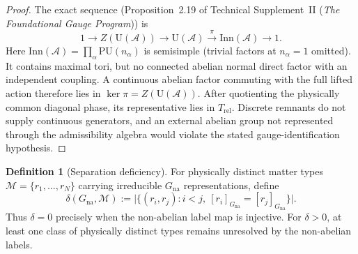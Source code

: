 \documentclass[11pt]{article}
\theoremstyle{definition}
\newtheorem{definition}[theorem]{Definition}
\newcommand{\TSII}{Technical Supplement~II (\emph{The Foundational Gauge Program})}
\begin{document}
\begin{proof}
The exact sequence (Proposition~2.19 of \TSII{}) is
\[
  1\longrightarrow Z(\mathrm U(\mathcal A))
  \longrightarrow \mathrm U(\mathcal A)
  \xrightarrow{\pi}\mathrm{Inn}(\mathcal A)\longrightarrow1.
\]
Here $\mathrm{Inn}(\mathcal A)=\prod_\alpha\mathrm{PU}(n_\alpha)$
is semisimple (trivial factors at $n_\alpha=1$ omitted).  It contains
maximal tori, but no connected abelian normal direct factor with an
independent coupling.  A continuous abelian factor commuting with the
full lifted action therefore lies in $\ker\pi=Z(\mathrm U(\mathcal A))$.
After quotienting the physically common diagonal phase, its
representative lies in $T_{\mathrm{rel}}$.  Discrete remnants do not
supply continuous generators, and an external abelian group not
represented through the admissibility algebra would violate the
stated gauge-identification hypothesis.
\end{proof}

\begin{definition}[Separation deficiency]\label{def:sep_deficiency}
For physically distinct matter types
$\mathcal M=\{r_1,\ldots,r_N\}$ carrying irreducible
$G_{\mathrm{na}}$ representations, define
\[
  \delta(G_{\mathrm{na}},\mathcal M)
  :=\bigl|\{(r_i,r_j):i<j,
  \ [r_i]_{G_{\mathrm{na}}}=[r_j]_{G_{\mathrm{na}}}\}\bigr|.
\]
Thus $\delta=0$ precisely when the non-abelian label map is injective.
For $\delta>0$, at least one class of physically distinct types remains
unresolved by the non-abelian labels.
\end{definition}
\end{document}
